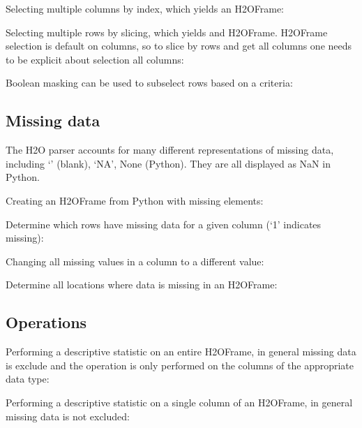 Selecting multiple columns by index, which yields an H2OFrame:


Selecting multiple rows by slicing, which yields and H2OFrame.
H2OFrame selection is default on columns, so to slice by rows
and get all columns one needs to be explicit about selection all columns:


Boolean masking can be used to subselect rows based on a criteria:



\subsection{Missing data}
The H2O parser accounts for many different representations of missing data, including `' (blank),
`NA', None (Python).  They are all displayed as NaN in Python.

Creating an H2OFrame from Python with missing elements:


Determine which rows have missing data for a given column (`1' indicates missing):


Changing all missing values in a column to a different value:


Determine all locations where data is missing in an H2OFrame:


\subsection{Operations}
Performing a descriptive statistic on an entire H2OFrame, in general missing data is exclude
and the operation is only performed on the columns of the appropriate data type:


Performing a descriptive statistic on a single column of an H2OFrame, in general missing data is
not excluded:


